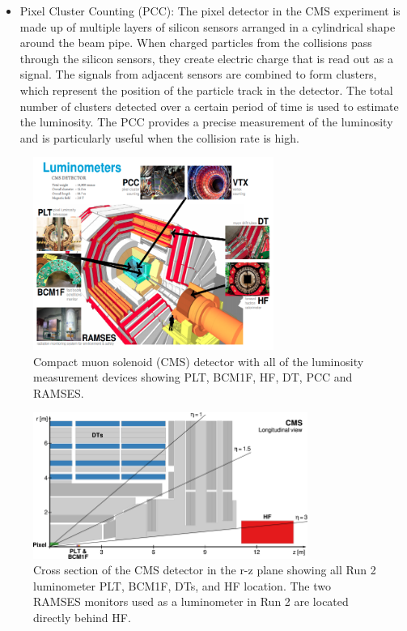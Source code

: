 \begin{itemize}
\item Pixel Cluster Counting (PCC): The pixel detector in the CMS experiment is made up of multiple layers of silicon sensors arranged in a cylindrical shape around the beam pipe. When charged particles from the collisions pass through the silicon sensors, they create electric charge that is read out as a signal. The signals from adjacent sensors are combined to form clusters, which represent the position of the particle track in the detector. The total number of clusters detected over a certain period of time is used to estimate the luminosity. The PCC provides a precise measurement of the luminosity and is particularly useful when the collision rate is high.

\end{itemize}

\begin{figure}[!htp]
\centering
\includegraphics[width=0.7\textwidth]{ashish_thesis/luminometer_cms.png}
\caption{%
   Compact muon solenoid (CMS) detector with all of the luminosity measurement devices showing PLT, BCM1F, HF, DT, PCC and RAMSES. 
}
\label{fig:lumino_cms}
\end{figure}


\begin{figure}[!htp]
\centering
\includegraphics[width=0.8\textwidth]{ashish_thesis/luminometer_cms_pseudo.png}
\caption{%
    Cross section of the CMS detector in the r-z plane showing all Run 2 luminometer PLT, BCM1F, DTs, and HF location. The two RAMSES monitors used as a luminometer in Run 2 are located directly behind HF. 
}
\label{fig:lumino_cms_pseudo}
\end{figure}

